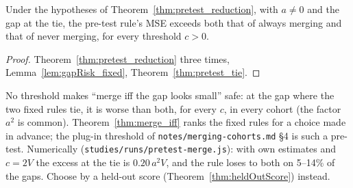\begin{corollary}\label{cor:pretest_mse_gt}
  \leanok
  Under the hypotheses of Theorem~\ref{thm:pretest_reduction}, with $a \ne 0$
  and the gap at the tie, the pre-test rule's MSE exceeds both that of always
  merging and that of never merging, for every threshold $c > 0$.
\end{corollary}
\begin{proof}
  \leanok
  Theorem~\ref{thm:pretest_reduction} three times, Lemma~\ref{lem:gapRisk_fixed},
  Theorem~\ref{thm:pretest_tie}.
\end{proof}

\begin{remark}[Finding 43]\label{rem:pretest_curse}
  No threshold makes ``merge iff the gap looks small'' safe: at the gap where
  the two fixed rules tie, it is worse than both, for every $c$, in every
  cohort (the factor $a^2$ is common). Theorem~\ref{thm:merge_iff} ranks the
  fixed rules for a choice made in advance; the plug-in threshold of
  \texttt{notes/merging-cohorts.md} \S4 is such a pre-test. Numerically
  (\texttt{studies/runs/pretest-merge.js}): with own estimates and $c = 2V$
  the excess at the tie is $0.20\,a^2V$, and the rule loses to both on
  5--14\% of the gaps. Choose by a held-out score (Theorem~\ref{thm:heldOutScore})
  instead.
\end{remark}
